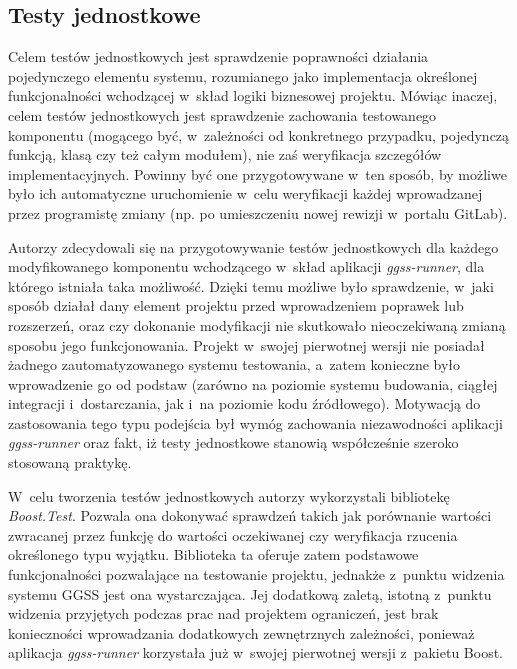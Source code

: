 \subsection{Testy jednostkowe}
Celem testów jednostkowych jest sprawdzenie poprawności działania pojedynczego elementu systemu, rozumianego jako implementacja określonej funkcjonalności wchodzącej w~skład logiki biznesowej projektu. Mówiąc inaczej, celem testów jednostkowych jest sprawdzenie zachowania testowanego komponentu (mogącego być, w~zależności od konkretnego przypadku, pojedynczą funkcją, klasą czy też całym modułem), nie zaś weryfikacja szczegółów implementacyjnych. Powinny być one przygotowywane w~ten sposób, by możliwe było ich automatyczne uruchomienie w~celu weryfikacji każdej wprowadzanej przez programistę zmiany (np. po umieszczeniu nowej rewizji w~portalu GitLab). 

Autorzy zdecydowali się na przygotowywanie testów jednostkowych dla każdego modyfikowanego komponentu wchodzącego w~skład aplikacji \emph{ggss-runner}, dla którego istniała taka możliwość. Dzięki temu możliwe było sprawdzenie, w~jaki sposób działał dany element projektu przed wprowadzeniem poprawek lub rozszerzeń, oraz czy dokonanie modyfikacji nie skutkowało nieoczekiwaną zmianą sposobu jego funkcjonowania. Projekt w~swojej pierwotnej wersji nie posiadał żadnego zautomatyzowanego systemu testowania, a~zatem konieczne było wprowadzenie go od podstaw (zarówno na poziomie systemu budowania, ciągłej integracji i~dostarczania, jak i~na poziomie kodu źródłowego). Motywacją do zastosowania tego typu podejścia był wymóg zachowania niezawodności aplikacji \emph{ggss-runner} oraz fakt, iż testy jednostkowe stanowią współcześnie szeroko stosowaną praktykę. 

W~celu tworzenia testów jednostkowych autorzy wykorzystali bibliotekę \emph{Boost.Test}. Pozwala ona dokonywać sprawdzeń takich jak porównanie wartości zwracanej przez funkcję do wartości oczekiwanej czy weryfikacja rzucenia określonego typu wyjątku. Biblioteka ta oferuje zatem podstawowe funkcjonalności pozwalające na testowanie projektu, jednakże z~punktu widzenia systemu GGSS jest ona wystarczająca. Jej dodatkową zaletą, istotną z~punktu widzenia przyjętych podczas prac nad projektem ograniczeń, jest brak konieczności wprowadzania dodatkowych zewnętrznych zależności, ponieważ aplikacja \emph{ggss-runner} korzystała już w~swojej pierwotnej wersji z~pakietu Boost.

